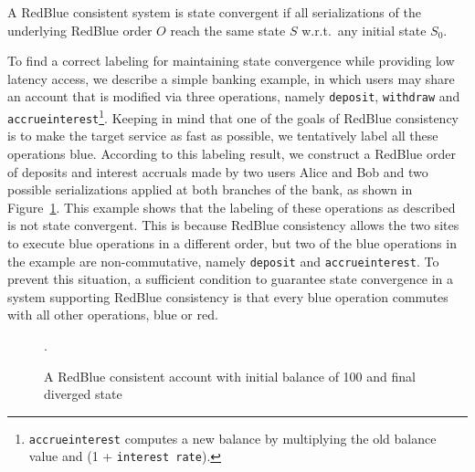 \begin{mydef}
A RedBlue consistent system is state convergent if all serializations of
the underlying RedBlue order $O$ reach the same state $S$ w.r.t.\ any initial state $S_0$.
\end{mydef}

To find a correct labeling for maintaining state convergence while providing low latency access, we describe a
simple banking example, in which users may share an account that is modified
via three operations, namely {\tt deposit}, {\tt withdraw} and {\tt accrueinterest}\footnote{{\tt accrueinterest}
computes a new balance by multiplying the old balance value and (1 + {\tt interest rate}).}. Keeping in mind that one of the goals of RedBlue consistency is to make the target service as fast as possible, we tentatively
label all these operations blue. According to this labeling result, we construct a RedBlue order of deposits and interest accruals made by two users Alice and Bob and two possible serializations applied at both branches
of the bank, as shown in Figure~\ref{fig:bankexample}. This example shows that the labeling of these operations as described is not state convergent. This is because
RedBlue consistency allows the two sites to execute blue operations in a different order, but
two of the blue operations in the example are non-commutative, namely
{\tt deposit} and {\tt accrueinterest}. To prevent this situation, a sufficient condition to guarantee
state convergence in a system supporting RedBlue consistency is that every blue operation commutes with all other operations, blue or red.

\begin{figure}[t]
\centering
\begin{minipage}[t]{0.46\columnwidth}
\centering
{}
\end{minipage}
\hfill
\begin{minipage}[t]{0.46\columnwidth}
\centering
{}
\end{minipage}
\caption{A RedBlue consistent account with initial balance of 100 and final diverged state}.
\label{fig:bankexample}
\end{figure}

